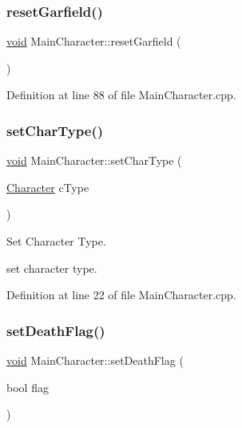 \subsubsection{\texorpdfstring{resetGarfield()}{resetGarfield()}}
{\footnotesize\ttfamily \mbox{\hyperlink{_s_d_l__opengles2__gl2ext_8h_ae5d8fa23ad07c48bb609509eae494c95}{void}} Main\+Character\+::reset\+Garfield (\begin{DoxyParamCaption}{ }\end{DoxyParamCaption})}



Definition at line 88 of file Main\+Character.\+cpp.

\mbox{\label{class_main_character_a992298eddcf6b2da1c3286872fa8f89e}} 
\subsubsection{\texorpdfstring{setCharType()}{setCharType()}}
{\footnotesize\ttfamily \mbox{\hyperlink{_s_d_l__opengles2__gl2ext_8h_ae5d8fa23ad07c48bb609509eae494c95}{void}} Main\+Character\+::set\+Char\+Type (\begin{DoxyParamCaption}\item[{\mbox{\hyperlink{_constants_8h_aba9a62a0230bce162e345c6b6e793273}{Character}}}]{c\+Type }\end{DoxyParamCaption})}



Set Character Type. 

set character type. 

Definition at line 22 of file Main\+Character.\+cpp.

\mbox{\label{class_main_character_afa84b9884b31ac21c0da334db8a3d611}} 
\subsubsection{\texorpdfstring{setDeathFlag()}{setDeathFlag()}}
{\footnotesize\ttfamily \mbox{\hyperlink{_s_d_l__opengles2__gl2ext_8h_ae5d8fa23ad07c48bb609509eae494c95}{void}} Main\+Character\+::set\+Death\+Flag (\begin{DoxyParamCaption}\item[{bool}]{flag }\end{DoxyParamCaption})}



